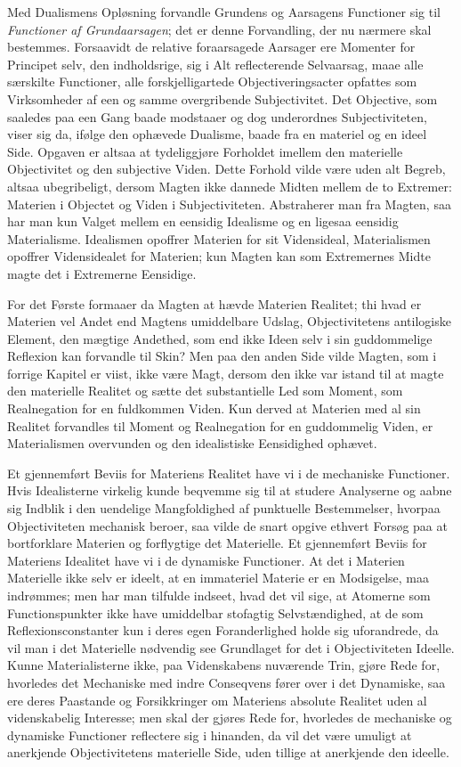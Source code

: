 \documentclass[12pt]{book}
\newcommand{\opage}[1]{\marginnote{\footnotesize\textit{[#1]}}}
\begin{document}
Med Dualismens Opløsning forvandle Grundens og Aarsagens Functioner sig til \emph{Functioner af
Grundaarsagen}; det er denne Forvandling, der nu nærmere skal bestemmes.
\opage{390} Forsaavidt de relative foraarsagede Aarsager ere Momenter for Principet selv, den indholdsrige,
sig i Alt reflecterende Selvaarsag, maae alle særskilte Functioner, alle forskjelligartede
Objectiveringsacter opfattes som Virksomheder af een og samme overgribende Subjectivitet. Det
Objective, som saaledes paa een Gang baade modstaaer og dog underordnes Subjectiviteten, viser
sig da, ifølge den ophævede Dualisme, baade fra en materiel og en ideel Side. Opgaven er altsaa
at tydeliggjøre Forholdet imellem den materielle Objectivitet og den subjective Viden. Dette
Forhold vilde være uden alt Begreb, altsaa ubegribeligt, dersom Magten ikke dannede Midten
mellem de to Extremer: Materien i Objectet og Viden i Subjectiviteten. Abstraherer man fra
Magten, saa har man kun Valget mellem en eensidig Idealisme og en ligesaa eensidig Materialisme.
Idealismen opoffrer Materien for sit Vidensideal, Materialismen opoffrer Vidensidealet for
Materien; kun Magten kan som Extremernes Midte magte det i Extremerne Eensidige.

For det Første formaaer da Magten at hævde Materien Realitet; thi hvad er Materien vel Andet end
Magtens umiddelbare Udslag, Objectivitetens antilogiske Element, den mægtige Andethed, som end
ikke Ideen selv i sin guddommelige Reflexion kan forvandle til Skin? Men paa den anden Side
vilde Magten, som i forrige Kapitel er viist, ikke være Magt, dersom den ikke var istand til at
magte den materielle Realitet og sætte det substantielle Led som Moment, som Realnegation for en
fuldkommen Viden. Kun derved at Materien med al sin Realitet forvandles til Moment og
Realnegation for en guddommelig Viden, er Materialismen overvunden og den idealistiske
Eensidighed ophævet.

Et gjennemført Beviis for Materiens Realitet have vi i de mechaniske Functioner. Hvis
Idealisterne virkelig kunde beqvemme sig til at studere Analyserne og aabne sig Indblik i den
uendelige Mangfoldighed af punktuelle Bestemmelser,
\opage{391} hvorpaa Objectiviteten mechanisk beroer, saa vilde de snart opgive ethvert Forsøg paa at
bortforklare Materien og forflygtige det Materielle. Et gjennemført Beviis for Materiens
Idealitet have vi i de dynamiske Functioner. At det i Materien Materielle ikke selv er ideelt,
at en immateriel Materie er en Modsigelse, maa indrømmes; men har man tilfulde indseet, hvad det
vil sige, at Atomerne som Functionspunkter ikke have umiddelbar stofagtig Selvstændighed, at de
som Reflexionsconstanter kun i deres egen Foranderlighed holde sig uforandrede, da vil man i det
Materielle nødvendig see Grundlaget for det i Objectiviteten Ideelle. Kunne Materialisterne
ikke, paa Videnskabens nuværende Trin, gjøre Rede for, hvorledes det Mechaniske med indre
Conseqvens fører over i det Dynamiske, saa ere deres Paastande og Forsikkringer om Materiens
absolute Realitet uden al videnskabelig Interesse; men skal der gjøres Rede for, hvorledes de
mechaniske og dynamiske Functioner reflectere sig i hinanden, da vil det være umuligt at
anerkjende Objectivitetens materielle Side, uden tillige at anerkjende den ideelle.
\end{document}
